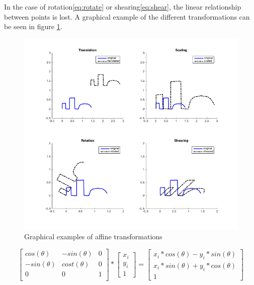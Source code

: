\documentclass[
    floatsintext
]{article}
\begin{document}
In the case of rotation\eqref{eq:rotate} or shearing\eqref{eq:shear}, the linear relationship between points is lost.
A graphical example of the different transformations can be seen in figure \ref{fig:affine_transform}.

\begin{figure}[hb]
  \centering
  \includegraphics[width=1\textwidth]{./figures/affine_transform.png}
  \caption{Graphical examples of affine transformations}
  \label{fig:affine_transform}
\end{figure}  

\begin{equation}
  \begin{bmatrix}
    cos(\theta)  & -sin(\theta) &   0 \\
    -sin(\theta) & cost(\theta) &   0 \\
    	0   	 &	0       &   1 \\ 
  \end{bmatrix} 
  *
  \begin{bmatrix}
    x_i \\ y_i \\ 1
  \end{bmatrix} 
  = 
  \begin{bmatrix}
    x_i * cos(\theta) - y_i * sin(\theta) \\ x_i * sin(\theta) + y_i * cos(\theta) \\ 1
  \end{bmatrix} 
  \label{eq:rotate}
\end{equation}
\end{document}
